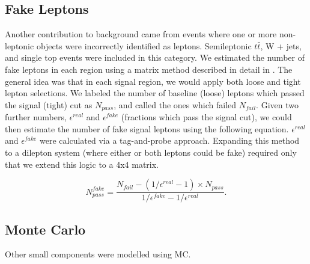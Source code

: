 \subsection*{Fake Leptons}

Another contribution to background came from events where one or more non-leptonic objects were incorrectly identified as leptons. Semileptonic $t\bar{t}$, W + jets, and single top events were included in this category. We estimated the number of fake leptons in each region using a matrix method described in detail in \cite{fake_method}. The general idea was that in each signal region, we would apply both loose and tight lepton selections. We labeled the number of baseline (loose) leptons which passed the signal (tight) cut as $N_{pass}$, and called the ones which failed $N_{fail}$. Given two further numbers, $\epsilon^{real}$ and $\epsilon^{fake}$ (fractions which pass the signal cut), we could then estimate the number of fake signal leptons using the following equation. $\epsilon^{real}$ and $\epsilon^{fake}$ were calculated via a tag-and-probe approach. Expanding this method to a dilepton system (where either or both leptons could be fake) required only that we extend this logic to a 4x4 matrix.

\begin{equation}
N_{pass}^{fake} = \frac{N_{fail}-(1/\epsilon^{real}-1)\times N_{pass}}{1/\epsilon^{fake}-1/\epsilon^{real}}.
\end{equation}

\subsection*{Monte Carlo}

Other small components were modelled using MC.